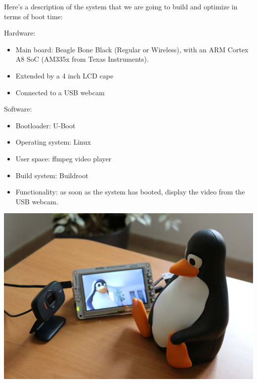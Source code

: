 
Here's a description of the system that we are going to build and
optimize in terms of boot time:

Hardware:
\begin{itemize}
\item Main board: Beagle Bone Black (Regular or Wireless), with an ARM
Cortex A8 SoC (AM335x from Texas Instruments).
\item Extended by a 4 inch LCD cape
\item Connected to a USB webcam
\end{itemize}

Software:
\begin{itemize}
\item Bootloader: U-Boot
\item Operating system: Linux
\item User space: ffmpeg video player
\item Build system: Buildroot
\item Functionality: as soon as the system has booted, display
      the video from the USB webcam.
\end{itemize}

\begin{center}
\includegraphics[width=\textwidth]{slides/beaglecam/beaglecam.jpg}
\end{center}
